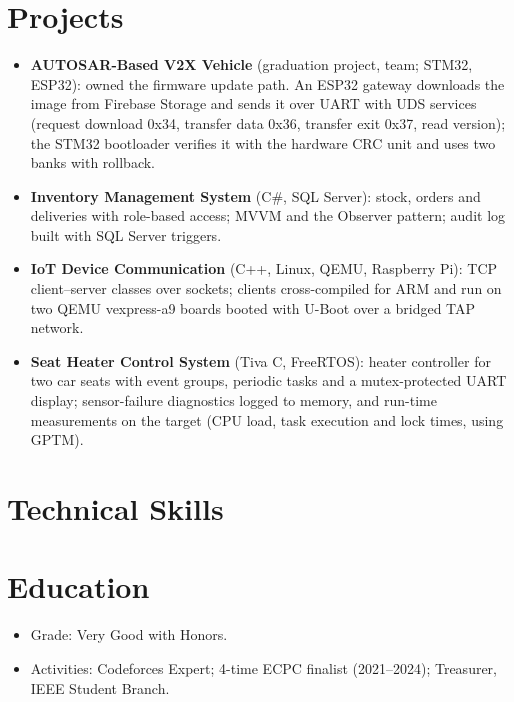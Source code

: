 \documentclass[10pt]{article}
\begin{document}
\section*{Projects}
\begin{itemize}
  \item \textbf{AUTOSAR-Based V2X Vehicle} (graduation project, team; STM32, ESP32): owned the firmware update path. An ESP32 gateway downloads the image from Firebase Storage and sends it over UART with UDS services (request download 0x34, transfer data 0x36, transfer exit 0x37, read version); the STM32 bootloader verifies it with the hardware CRC unit and uses two banks with rollback. 
  \item \textbf{Inventory Management System} (C\#, SQL Server): stock, orders and deliveries with role-based access; MVVM and the Observer pattern; audit log built with SQL Server triggers. 
  \item \textbf{IoT Device Communication} (C++, Linux, QEMU, Raspberry Pi): TCP client--server classes over sockets; clients cross-compiled for ARM and run on two QEMU vexpress-a9 boards booted with U-Boot over a bridged TAP network. 
  \item \textbf{Seat Heater Control System} (Tiva C, FreeRTOS): heater controller for two car seats with event groups, periodic tasks and a mutex-protected UART display; sensor-failure diagnostics logged to memory, and run-time measurements on the target (CPU load, task execution and lock times, using GPTM). 
\end{itemize}

\section*{Technical Skills}

\section*{Education}
\begin{itemize}
  \item Grade: Very Good with Honors.
  \item Activities: Codeforces Expert; 4-time ECPC finalist (2021--2024); Treasurer, IEEE Student Branch.
\end{itemize}
\end{document}
